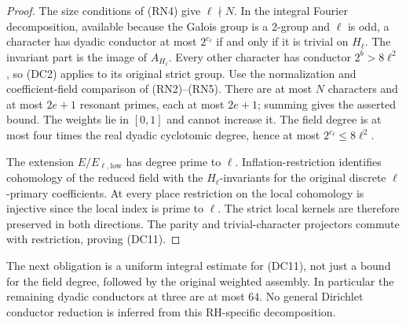 \begin{proof}
The size conditions of (RN4) give $\ell\nmid N$.
In the integral Fourier decomposition, available because
the Galois group is a $2$-group and $\ell$ is odd, a
character has dyadic conductor at most $2^{c_\ell}$ if
and only if it is trivial on $H_\ell$. The invariant
part is the image of $A_{H_\ell}$.
Every other character has conductor $2^b>8\ell^2$,
so (DC2) applies to its original strict group.
Use the normalization and coefficient-field comparison
of (RN2)--(RN5). There are at most $N$ characters and
at most $2e+1$ resonant primes, each at most $2e+1$;
summing gives the asserted bound. The weights lie in
$[0,1]$ and cannot increase it. The field degree is
at most four times the real dyadic cyclotomic degree,
hence at most $2^{c_\ell}\le8\ell^2$.

The extension $E/E_{\ell,\mathrm{low}}$ has degree prime
to $\ell$. Inflation-restriction identifies cohomology
of the reduced field with the $H_\ell$-invariants for
the original discrete $\ell$-primary coefficients.
At every place restriction on the local cohomology is
injective since the local index is prime to $\ell$.
The strict local kernels are therefore preserved in
both directions. The parity and trivial-character
projectors commute with restriction, proving (DC11).
\end{proof}

The next obligation is a uniform integral estimate for
(DC11), not just a bound for the field degree, followed
by the original weighted assembly. In particular the
remaining dyadic conductors at three are at most $64$.
No general Dirichlet conductor reduction is inferred
from this RH-specific decomposition.

